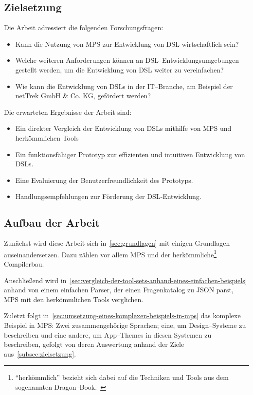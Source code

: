 \subsection{Zielsetzung}\label{subsec:zielsetzung}
Die Arbeit adressiert die folgenden Forschungsfragen:
\begin{itemize}
    \item Kann die Nutzung von \ac{MPS} zur Entwicklung von \ac{DSL} wirtschaftlich sein?
    \item Welche weiteren Anforderungen können an \ac{DSL}--Entwicklungsumgebungen gestellt werden, um die Entwicklung von \ac{DSL} weiter zu vereinfachen?
    \item Wie kann die Entwicklung von \acp{DSL} in der \acs{IT}--Branche, am Beispiel der netTrek GmbH \& Co. KG, gefördert werden?
\end{itemize}
Die erwarteten Ergebnisse der Arbeit sind:
\begin{itemize}
    \item Ein direkter Vergleich der Entwicklung von \acp{DSL} mithilfe von \ac{MPS} und herkömmlichen Tools
    \item Ein funktionsfähiger Prototyp zur effizienten und intuitiven Entwicklung von DSLs.
    \item Eine Evaluierung der Benutzerfreundlichkeit des Prototyps.
    \item Handlungsempfehlungen zur Förderung der DSL-Entwicklung.
\end{itemize}

\subsection{Aufbau der Arbeit}\label{subsec:aufbau-der-arbeit}
Zunächst wird diese Arbeit sich in~\autoref{sec:grundlagen} mit einigen Grundlagen auseinandersetzen.
Dazu zählen vor allem \ac{MPS} und der herkömmliche\footnote{\enquote{herkömmlich} bezieht sich dabei auf die Techniken und Tools aus dem sogenannten Dragon--Book.~\autocite{aho-2006}} Compilerbau.

Anschließend wird in~\autoref{sec:vergleich-der-tool-sets-anhand-eines-einfachen-beispiels} anhand von einem einfachen Parser, der einen Fragenkatalog zu \ac{JSON} parst, \ac{MPS} mit den herkömmlichen Tools verglichen.

Zuletzt folgt in~\autoref{sec:umsetzung-eines-komplexen-beispiels-in-mps} das komplexe Beispiel in \ac{MPS}: Zwei zusammengehörige Sprachen; eine, um Design--Systeme zu beschreiben und eine andere, um App--Themes in diesen Systemen zu beschreiben, gefolgt von deren Auswertung anhand der Ziele aus~\autoref{subsec:zielsetzung}.
